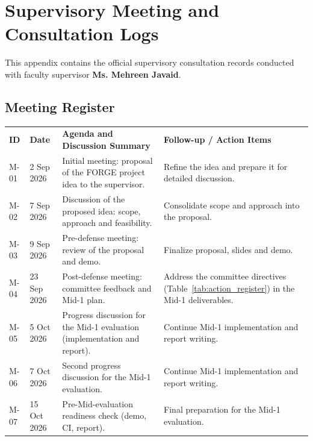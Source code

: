 \chapter{Supervisory Meeting and Consultation Logs}
\label{app:meetings}

This appendix contains the official supervisory consultation records conducted with faculty supervisor \textbf{Ms. Mehreen Javaid}.

\section{Meeting Register}

{\small
\begin{longtable}{p{}p{}p{}p{}}
\toprule
\textbf{ID} & \textbf{Date} & \textbf{Agenda and Discussion Summary} & \textbf{Follow-up / Action Items} \\
M-01 & 2 Sep 2026 & Initial meeting: proposal of the FORGE project idea to the supervisor. & Refine the idea and prepare it for detailed discussion. \\
M-02 & 7 Sep 2026 & Discussion of the proposed idea: scope, approach and feasibility. & Consolidate scope and approach into the proposal. \\
M-03 & 9 Sep 2026 & Pre-defense meeting: review of the proposal and demo. & Finalize proposal, slides and demo. \\
M-04 & 23 Sep 2026 & Post-defense meeting: committee feedback and Mid-1 plan. & Address the committee directives (Table~\ref{tab:action_register}) in the Mid-1 deliverables. \\
M-05 & 5 Oct 2026 & Progress discussion for the Mid-1 evaluation (implementation and report). & Continue Mid-1 implementation and report writing. \\
M-06 & 7 Oct 2026 & Second progress discussion for the Mid-1 evaluation. & Continue Mid-1 implementation and report writing. \\
M-07 & 15 Oct 2026 & Pre-Mid-evaluation readiness check (demo, CI, report). & Final preparation for the Mid-1 evaluation. \\
\bottomrule
\end{longtable}
}
